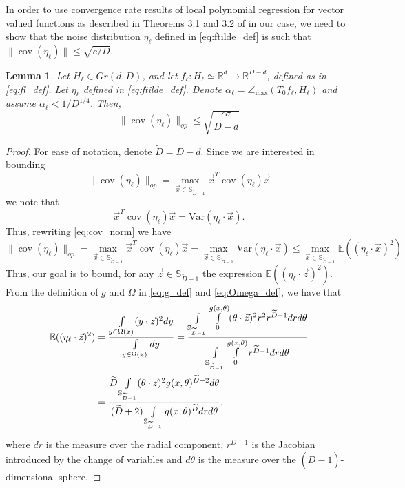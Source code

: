 \documentclass[12pt]{article}
\newtheorem{Lemma}[Theorem]{Lemma}
\theoremstyle{remark}
\newcommand{\RR}{\mathbb{R}}
\newcommand{\EE}{\mathbb{E}}
\newcommand{\wtilde}[1]{\widetilde{#1}}
\newcommand{\maxangle}{\angle_{\max}}
\DeclareMathOperator{\cov}{cov}
\begin{document}
\begin{appendices}
In order to use convergence rate results of local polynomial regression for vector valued functions as described in Theorems 3.1 and 3.2 of \cite{aizenbud2021VectorEstimation} in our case, we need to show that the noise distribution $\eta_\ell$ defined in \eqref{eq:ftilde_def} is such that $\|\cov(\eta_\ell)\|\leq \sqrt{c/D}$.
\begin{Lemma}\label{lem:noise_cov_bound}
 Let $H_\ell\in Gr(d, D)$, and let $f_\ell:H_\ell\simeq\RR^d \rightarrow \RR^{D-d}$, defined as in \eqref{eq:fl_def}. Let  $\eta_\ell$ defined in \eqref{eq:ftilde_def}. Denote 
$\alpha_\ell = \maxangle (T_0f_{\ell}, H_{\ell})$ and assume $\alpha_\ell<1/D^{1/4}$. Then, 
\[
\|\cov(\eta_\ell)\|_{op} \leq \sqrt{\frac{c\sigma}{D-d}}
\]
    
\end{Lemma}
\begin{proof}
For ease of notation, denote $\wtilde{D} = D-d$.
Since we are interested in bounding 
\begin{equation}\label{eq:cov_norm}
\|\cov(\eta_\ell) \|_{op} = \max_{\vec{x}\in \mathbb{S}_{\wtilde{D} - 1} } \vec{x}^T \cov(\eta_\ell)\vec{x}
\end{equation}
we note that 
\[
\vec{x}^T\cov(\eta_\ell)\vec{x} = \mbox{Var}(\eta_\ell\cdot \vec x)
.\]
Thus, rewriting \eqref{eq:cov_norm} we have
\begin{equation}\label{eq:cov_norm2}
    \|\cov(\eta_\ell)\|_{op}= \max_{\vec{x}\in \mathbb{S}_{\wtilde{D} - 1}} \vec{x}^T\cov(\eta_\ell)\vec{x} = \max_{\vec{x}\in \mathbb{S}_{\wtilde{D} - 1}}\mbox{Var}(\eta_\ell\cdot \vec{x}) \leq \max_{\vec{x}\in \mathbb{S}_{\wtilde{D} - 1}}\EE((\eta_\ell\cdot \vec{x})^2)
\end{equation}
Thus, our goal is to bound, for any $\vec{z}\in \mathbb{S}_{\wtilde{D} - 1}$  the expression $\EE((\eta_\ell\cdot \vec{z})^2)$. From the definition of $g$ and $\Omega$ in \eqref{eq:g_def} and \eqref{eq:Omega_def}, we have that
\begin{align}\label{eq:E(Z_z)}
\EE((\eta_\ell\cdot \vec{z})^2) &= \frac{\int\limits_{y\in\Omega(x)} (y \cdot \vec{z})^2 dy}{\int\limits_{y\in\Omega(x)} dy} = 
\frac{\int\limits_{\mathbb{S}_{\wtilde D - 1}}\int\limits_0^{g(x,\theta)} (\theta \cdot \vec{z})^2 r^2 r^{\wtilde D-1} drd\theta}{\int\limits_{\mathbb{S}_{\wtilde D - 1}}\int\limits_0^{g(x,\theta)} r^{\wtilde D-1} drd\theta} \notag\\
& = \frac{\wtilde D\int\limits_{\mathbb{S}_{\wtilde D - 1}}(\theta \cdot \vec{z})^2 g(x,\theta)^{\wtilde D+2} d\theta}{(\wtilde D+2)\int\limits_{\mathbb{S}_{\wtilde D - 1}}g(x,\theta)^{\wtilde D} drd\theta}     
,\end{align}
where $dr$ is the measure over the radial component, $r^{\wtilde D-1}$ is the Jacobian introduced by the change of variables and $d\theta$ is the measure over the $(\wtilde D-1)$-dimensional sphere.


\end{proof}
\end{appendices}
\end{document}
